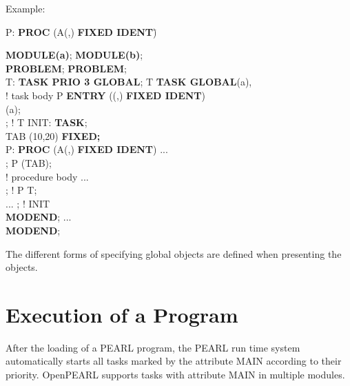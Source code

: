 Example:



\begin{tabbing}
\x P: {\bf PROC} (A(,) {\bf FIXED IDENT})\=  \kill

{\bf MODULE(a)};                  \> {\bf MODULE(b)};\\
{\bf PROBLEM};                    \> {\bf PROBLEM};\\
\x T: {\bf TASK PRIO 3 GLOBAL};   \>  T {\bf TASK GLOBAL}(a),\\
\x \x \x ! task body              \> \x \x P {\bf ENTRY} ((,) {\bf FIXED IDENT}) \\
				  \> \x \x \x \x {\bf GLOBAL}(a);\\
; ! T              \> \x INIT: {\bf TASK};\\
                                  \> \x {} TAB (10,20) {\bf FIXED;}\\
\x P: {\bf PROC} (A(,) {\bf FIXED IDENT}) \> \x \x ...\\
\x \x \x {};         \> \x {} P (TAB);\\
\x \x \x ! procedure body         \> \x \x ... \\
; ! P              \> \x {} T;\\
\x ...                            \> ; ! INIT\\
{\bf MODEND};                     \> \x ...\\
                                  \> {\bf MODEND};
\end{tabbing}

The different forms of specifying global objects are defined when
presenting the objects.

\section{Execution of a Program}   %
\label{sec_program_execution}

After the loading of a PEARL program, the PEARL run time system
automatically starts all tasks marked by the attribute MAIN according
to their priority.  
OpenPEARL supports tasks with attribute MAIN in multiple modules.

